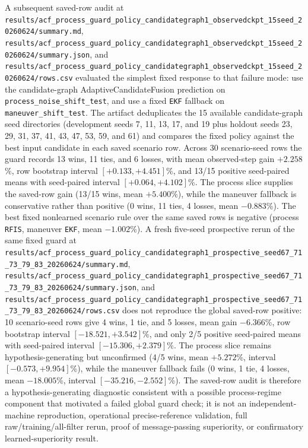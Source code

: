 \documentclass{article}
\begin{document}
A subsequent saved-row audit at \nolinkurl{results/acf_process_guard_policy_candidategraph1_observedckpt_15seed_20260624/summary.md}, \nolinkurl{results/acf_process_guard_policy_candidategraph1_observedckpt_15seed_20260624/summary.json}, and \nolinkurl{results/acf_process_guard_policy_candidategraph1_observedckpt_15seed_20260624/rows.csv} evaluated the simplest fixed response to that failure mode: use the candidate-graph AdaptiveCandidateFusion prediction on \texttt{process\_noise\_shift\_test}, and use a fixed \texttt{EKF} fallback on \texttt{maneuver\_shift\_test}. The artifact deduplicates the 15 available candidate-graph seed directories (development seeds 7, 11, 13, 17, and 19 plus holdout seeds 23, 29, 31, 37, 41, 43, 47, 53, 59, and 61) and compares the fixed policy against the best input candidate in each saved scenario row. Across 30 scenario-seed rows the guard records 13 wins, 11 ties, and 6 losses, with mean observed-step gain \(+2.258\)\%, row bootstrap interval \([+0.133,+4.451]\)\%, and 13/15 positive seed-paired means with seed-paired interval \([+0.064,+4.102]\)\%. The process slice supplies the saved-row gain (13/15 wins, mean \(+5.400\)\%), while the maneuver fallback is conservative rather than positive (0 wins, 11 ties, 4 losses, mean \(-0.883\)\%). The best fixed nonlearned scenario rule over the same saved rows is negative (process \texttt{RFIS}, maneuver \texttt{EKF}, mean \(-1.002\)\%). A fresh five-seed prospective rerun of the same fixed guard at \nolinkurl{results/acf_process_guard_policy_candidategraph1_prospective_seed67_71_73_79_83_20260624/summary.md}, \nolinkurl{results/acf_process_guard_policy_candidategraph1_prospective_seed67_71_73_79_83_20260624/summary.json}, and \nolinkurl{results/acf_process_guard_policy_candidategraph1_prospective_seed67_71_73_79_83_20260624/rows.csv} does not reproduce the global saved-row positive: 10 scenario-seed rows give 4 wins, 1 tie, and 5 losses, mean gain \(-6.366\)\%, row bootstrap interval \([-18.521,+3.542]\)\%, and only 2/5 positive seed-paired means with seed-paired interval \([-15.306,+2.379]\)\%. The process slice remains hypothesis-generating but unconfirmed (4/5 wins, mean \(+5.272\)\%, interval \([-0.573,+9.954]\)\%), while the maneuver fallback fails (0 wins, 1 tie, 4 losses, mean \(-18.005\)\%, interval \([-35.216,-2.552]\)\%). The saved-row audit is therefore a hypothesis-generating diagnostic consistent with a possible process-regime component that motivated a failed global guard check; it is not an independent-machine reproduction, operational precise-reference validation, full raw/training/all-filter rerun, proof of message-passing superiority, or confirmatory learned-superiority result.
\end{document}
